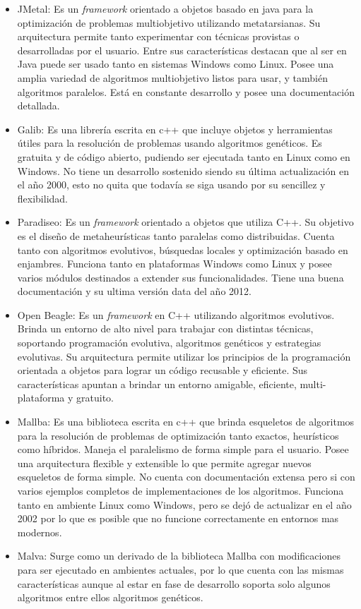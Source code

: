 \begin{itemize}
	\item JMetal: Es un \emph{framework} orientado a objetos basado en java para la optimización de problemas multiobjetivo utilizando metatarsianas. Su arquitectura permite tanto experimentar con técnicas provistas o desarrolladas por el usuario. Entre sus características destacan que al ser en Java puede ser usado tanto en sistemas Windows como Linux. Posee una amplia variedad de algoritmos multiobjetivo listos para usar, y también algoritmos paralelos. Está en constante desarrollo y posee una documentación detallada.\citep{Jmetal}
	
	\item Galib: Es una librería escrita en c++ que incluye objetos y herramientas útiles para la resolución de problemas usando algoritmos genéticos. Es gratuita y de código abierto, pudiendo ser ejecutada tanto en Linux como en Windows. No tiene un desarrollo sostenido siendo su última actualización en el año 2000, esto no quita que todavía se siga usando por su sencillez y flexibilidad. \citep{Galib}
	
	\item Paradiseo: Es un \emph{framework} orientado a objetos que utiliza C++. Su objetivo es el diseño de metaheurísticas tanto paralelas como distribuidas. Cuenta tanto con algoritmos evolutivos, búsquedas locales y optimización basado en enjambres. Funciona tanto en plataformas Windows como Linux y posee varios módulos destinados a extender sus funcionalidades. Tiene una buena documentación y su ultima versión data del año 2012. \citet{Paradiseo}
	
	\item Open Beagle: Es un \emph{framework} en C++ utilizando algoritmos evolutivos. Brinda un entorno de alto nivel para trabajar con distintas técnicas, soportando programación evolutiva, algoritmos genéticos y estrategias evolutivas. Su arquitectura permite utilizar los principios de la programación orientada a objetos para lograr un código recusable y eficiente. Sus características apuntan a brindar un entorno amigable, eficiente, multi-plataforma y gratuito. \citep{OpenBeagle}
	
	\item Mallba: Es una biblioteca escrita en c++ que brinda esqueletos de algoritmos para la resolución de problemas de optimización tanto exactos, heurísticos como híbridos. Maneja el paralelismo de forma simple para el usuario. Posee una arquitectura flexible y extensible lo que permite agregar nuevos esqueletos de forma simple. No cuenta con documentación extensa pero si con varios ejemplos completos de implementaciones de los algoritmos. Funciona tanto en ambiente Linux como Windows, pero se dejó de actualizar en el año 2002 por lo que es posible que no funcione correctamente en entornos mas modernos. \citep{Mallba}
	
	\item Malva: Surge como un derivado de la biblioteca Mallba con modificaciones para ser ejecutado en ambientes actuales, por lo que cuenta con las mismas características aunque al estar en fase de desarrollo soporta solo algunos algoritmos entre ellos algoritmos genéticos. \citep{Malva}
\end{itemize}

